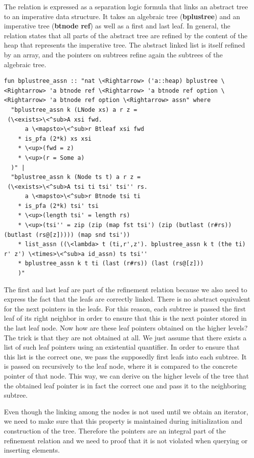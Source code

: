 \documentclass[a4paper,UKenglish,cleveref, autoref, thm-restate]{lipics-v2021}
\begin{document}
The relation is expressed as a separation logic formula that links an abstract tree to an
imperative data structure.
It takes an algebraic tree (\textbf{bplustree}) and an imperative tree
(\textbf{btnode ref}) as well as a first and last leaf.
In general, the relation states that all parts of the abstract tree
are refined by the content of the heap that represents the imperative tree.
The abstract linked list is itself refined by an array,
and the pointers on subtrees refine again the subtrees of the algebraic tree.

\begin{lstlisting}[mathescape=true, language=Isabelle,label=lst:btree-relation]
fun bplustree_assn :: "nat \<Rightarrow> ('a::heap) bplustree \<Rightarrow> 'a btnode ref \<Rightarrow> 'a btnode ref option \<Rightarrow> 'a btnode ref option \<Rightarrow> assn" where
  "bplustree_assn k (LNode xs) a r z =
 (\<exists>\<^sub>A xsi fwd.
      a \<mapsto>\<^sub>r Btleaf xsi fwd
    * is_pfa (2*k) xs xsi
    * \<up>(fwd = z)
    * \<up>(r = Some a)
  )" |
  "bplustree_assn k (Node ts t) a r z =
 (\<exists>\<^sub>A tsi ti tsi' tsi'' rs.
      a \<mapsto>\<^sub>r Btnode tsi ti
    * is_pfa (2*k) tsi' tsi
    * \<up>(length tsi' = length rs)
    * \<up>(tsi'' = zip (zip (map fst tsi') (zip (butlast (r#rs)) (butlast (rs@[z])))) (map snd tsi'))
    * list_assn ((\<lambda> t (ti,r',z'). bplustree_assn k t (the ti) r' z') \<times>\<^sub>a id_assn) ts tsi''
    * bplustree_assn k t ti (last (r#rs)) (last (rs@[z]))
    )"
\end{lstlisting}

The first and last leaf are part of the refinement relation because
we also need to express the fact that the leafs are correctly linked.
There is no abstract equivalent for the next pointers in the leafs.
For this reason, each subtree is passed the first leaf of its right neighbor
in order to ensure that this is the next pointer stored in the last leaf node.
Now how are these leaf pointers obtained on the higher levels?
The trick is that they are not obtained at all.
We just assume that there exists a list of such leaf pointers using an existential quantifier.
In order to ensure that this list is the correct one, we pass the supposedly
first leafs into each subtree.
It is passed on recursively to the leaf node,
where it is compared to the concrete pointer of that node.
This way, we can derive on the higher levels of the tree
that the obtained leaf pointer is in fact the correct one and pass it to the
neighboring subtree.

Even though the linking among the nodes is not used until we obtain
an iterator, we need to make sure that this property is maintained
during initialization and construction of the tree.
Therefore the pointers are an integral part of the refinement relation
and we need to proof that it is not violated when querying or inserting elements.
\end{document}

